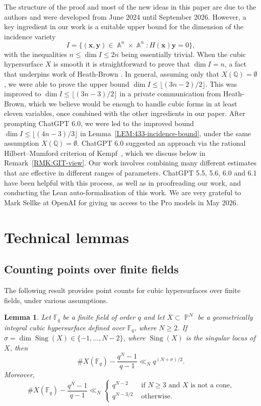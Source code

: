 \documentclass[a4paper,11pt, twoside,reqno]{amsart}
\theoremstyle{plain}
\newtheorem{lemma}[thm]{Lemma}
\theoremstyle{definition}
\theoremstyle{remark}
\newcommand{\QQ}{\mathbb{Q}}
\DeclareMathOperator{\sing}{Sing}
\DeclareMathOperator{\A}{\mathbb{A}}
\DeclareMathOperator{\PP}{\mathbb{P}}
\renewcommand{\le}{\leqslant}
\renewcommand{\leq}{\leqslant}
\renewcommand{\ge}{\geqslant}
\renewcommand{\geq}{\geqslant}
\newcommand{\FF}{\mathbb{F}}
\numberwithin{equation}{section}
\begin{document}
The structure of the proof and most of the new ideas in this paper are due to the authors and were developed from  June 2024 until September 2026.  However, a key ingredient in our work is a suitable upper bound for the dimension of the incidence variety
\[
I = \{(\bm{x},\bm{y})\in \A^n\times \A^n\colon H(\bm{x})\bm{y}=0\},
\]
with the inequalities $n\leq \dim I\leq 2n$ being essentially trivial.  When the cubic hypersurface $X$ is smooth it is straightforward to prove that 
$\dim I=n$, a fact that underpins  work of Heath-Brown \cite[Lemma~1]{hb10}.
In general, 
assuming only that $X(\QQ)=\emptyset$, we were able to prove the upper bound 
$\dim I\leq \lfloor(3n-2)/2\rfloor$. This was improved to 
$\dim I\leq \lfloor(3n-3)/2\rfloor$ in a private communication from Heath-Brown, which we believe would be enough to handle cubic forms in at least eleven variables, once combined with the other ingredients in our paper.  After prompting 
ChatGPT 6.0, we were led to the improved  bound 
$\dim I \le \lfloor (4n-3)/3\rfloor$ in
Lemma~\ref{LEM:433-incidence-bound}, under the same assumption 
$X(\QQ)=\emptyset$.
ChatGPT 6.0  suggested an approach via the rational Hilbert--Mumford criterion of Kempf~\cite[Corollary~4.3]{Kem78}, which we discuss below in Remark~\ref{RMK:GIT-view}.
Our work involves combining many different estimates that are effective in different ranges of parameters. 
ChatGPT 5.5, 5.6, 6.0 and 6.1 have been helpful with this process, 
as well as in 
proofreading our work, and conducting the Lean auto-formalisation of this work.  
We are very grateful to Mark Sellke at OpenAI for giving us access to the Pro models in 
May 2026. 



\section{Technical lemmas}
\label{sec:technical-lemmas}



\subsection{Counting points over finite fields}

The following result provides point counts for cubic hypersurfaces over finite fields, under various assumptions. 


\begin{lemma}\label{lem:Fq}
Let $\FF_q$ be a finite field of order $q$ and
let $X\subset \PP^{N}$ be a geometrically integral cubic hypersurface defined over $\FF_q$,
where $N\ge 2$.
If $\sigma=\dim \sing(X)\in \{-1,\dots,N-2\}$, where $\sing(X)$ is the singular locus of $X$, then
\begin{equation*}
\#X(\FF_q)-\frac{q^N-1}{q-1}
\ll_N q^{(N+\sigma)/2}.
\end{equation*}
Moreover,
$$
\#X(\FF_q)-\frac{q^N-1}{q-1}\ll_N
\begin{cases}
q^{N-2} & \text{ if $N\geq 3$ and $X$ is not a cone,}\\
q^{N-3/2} &\text{ otherwise.}
\end{cases}
$$
\end{lemma}
\end{document}
